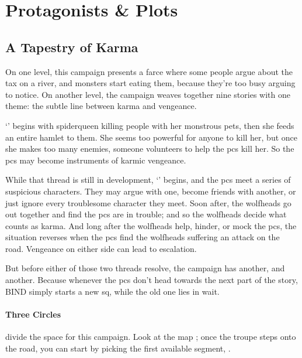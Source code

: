 \chapter{Protagonists \& Plots}
\label{sideQuestIntro}

\section{A Tapestry of Karma}
\label{sqSummaries}

\begin{multicols}{2}

\noindent
On one level, this \gls{campaign} presents a farce where some people argue about the tax on a river, and monsters start eating them, because they're too busy arguing to notice.
On another level, the \gls{campaign} weaves together nine stories with one theme: the subtle line between karma and vengeance.

`' begins with \gls{spiderqueen} killing people with her monstrous pets, then she feeds an entire hamlet to them.
She seems too powerful for anyone to kill her, but once she makes too many enemies, someone volunteers to help the \glspl{pc} kill her.
So the \glspl{pc} may become instruments of karmic vengeance.

While that thread is still in development, `' begins, and the \glspl{pc} meet a series of suspicious characters.
They may argue with one, become friends with another, or just ignore every troublesome character they meet.
Soon after, the \glspl{wolfhead} go out together and find the \glspl{pc} are in trouble; and so the \glspl{wolfhead} decide what counts as karma.
And long after the \glspl{wolfhead} help, hinder, or mock the \glspl{pc}, the situation reverses when the \glspl{pc} find the \glspl{wolfhead} suffering an attack on the road.
Vengeance on either side can lead to escalation.

But before either of those two threads resolve, the \gls{campaign} has another, and another.
Because whenever the \glspl{pc} don't head towards the next part of the story, BIND simply starts a new \gls{sq}, while the old one lies in wait.

\subsubsection{Three Circles}
divide the space for this \gls{campaign}.
Look at the map ; once the troupe steps onto the road, you can start  by picking the first available \gls{segment}, .


\end{multicols}
